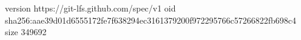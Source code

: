version https://git-lfs.github.com/spec/v1
oid sha256:aae39d01d6555172fe7f638294ec3161379200f972295766c57266822fb698c4
size 349692
